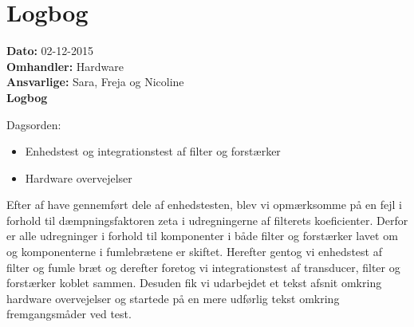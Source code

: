 \section{Logbog}

\textbf{Dato:} 02-12-2015 \\
\textbf{Omhandler:} Hardware \\
\textbf{Ansvarlige:} Sara, Freja og Nicoline \\
\textbf{Logbog}

Dagsorden:
\begin{itemize}
	\item Enhedstest og integrationstest af filter og forstærker
	\item Hardware overvejelser
\end{itemize}
Efter af have gennemført dele af enhedstesten, blev vi opmærksomme på en fejl i forhold til dæmpningsfaktoren zeta i udregningerne af filterets koeficienter. Derfor er alle udregninger i forhold til komponenter i både filter og forstærker lavet om og komponenterne i fumlebrætene er skiftet.
Herefter gentog vi enhedstest af filter og fumle bræt og derefter foretog vi integrationstest af transducer, filter og forstærker koblet sammen.
Desuden fik vi udarbejdet et tekst afsnit omkring hardware overvejelser og startede på en mere udførlig tekst omkring fremgangsmåder ved test.